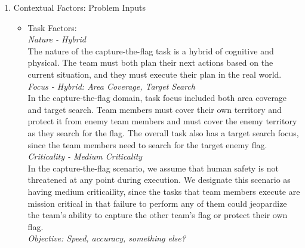 \documentclass[letterpaper, 10 pt, conference]{ieeeconf}  %
\theoremstyle{definition}
\begin{document}
\begin{enumerate}
\begin{enumerate}
    \item Contextual Factors: Problem Inputs
    \begin{itemize}
        \item Task Factors:\\
        \textit{Nature - Hybrid}\\
        The nature of the capture-the-flag task is a hybrid of cognitive and physical. The team must both plan their next actions based on the current situation, and they must execute their plan in the real world. \\
        \textit{Focus - Hybrid: Area Coverage, Target Search}\\
        In the capture-the-flag domain, task focus included both area coverage and target search. Team members must cover their own territory and protect it from enemy team members and must cover the enemy territory as they search for the flag. The overall task also has a target search focus, since the team members need to search for the target enemy flag. 
        \textit{Criticality - Medium Criticality}\\
        In the capture-the-flag scenario, we assume that human safety is not threatened at any point during execution. We designate this scenario as having medium criticaility, since the tasks that team members execute are mission critical in that failure to perform any of them could jeopardize the team's ability to capture the other team's flag or protect their own flag.\\
        \textit{Objective: Speed, accuracy, something else?}
        

\end{itemize}
\end{enumerate}
\end{enumerate}
\end{document}
